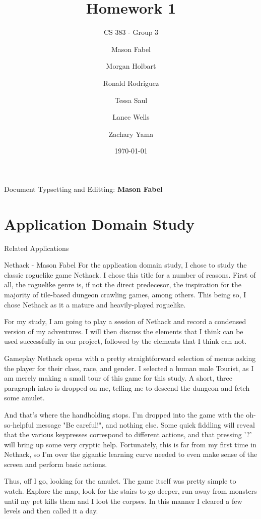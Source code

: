 \documentclass[12pt]{report}
\title{Homework 1}
\subtitle{CS 383 - Group 3}
\author{
Mason Fabel \\
\and Morgan Holbart \\
\and Ronald Rodriguez \\
\and Tessa Saul \\
\and Lance Wells \\
\and Zachary Yama \\
}
\date{\today}
\begin{document}
\maketitle

\tableofcontents
Document Typsetting and Editting: \textbf{Mason Fabel}
\clearpage

\chapter{Application Domain Study}

\begin{section}{Related Applications}

\begin{subsection}{Nethack - Mason Fabel}
For the application domain study, I chose to study the classic roguelike
game Nethack. I chose this title for a number of reasons. First of all,
the roguelike genre is, if not the direct predecesor, the inspiration for
the majority of tile-based dungeon crawling games, among others. This
being so, I chose Nethack as it a mature and heavily-played roguelike.

For my study, I am going to play a session of Nethack and record a
condensed version of my adventures. I will then discuss the elements that
I think can be used successfully in our project, followed by the elements
that I think can not.

\begin{subsubsection}{Gameplay}
Nethack opens with a pretty straightforward selection of menus asking the
player for their class, race, and gender. I selected a human male Tourist,
as I am merely making a small tour of this game for this study. A short,
three paragraph intro is dropped on me, telling me to descend the
dungeon and fetch some amulet.

And that's where the handholding stops. I'm dropped into the game with the
oh-so-helpful message "Be careful!", and nothing else. Some quick fiddling
will reveal that the various keypresses correspond to different actions,
and that pressing '?' will bring up some very cryptic help. Fortunately,
this is far from my first time in Nethack, so I'm over the gigantic
learning curve needed to even make sense of the screen and perform basic
actions.

Thus, off I go, looking for the amulet. The game itself was pretty simple
to watch. Explore the map, look for the stairs to go deeper, run away from
monsters until my pet kills them and I loot the corpses. In this manner I
cleared a few levels and then called it a day.
\end{subsubsection}


\end{subsection}
\end{section}
\end{document}
